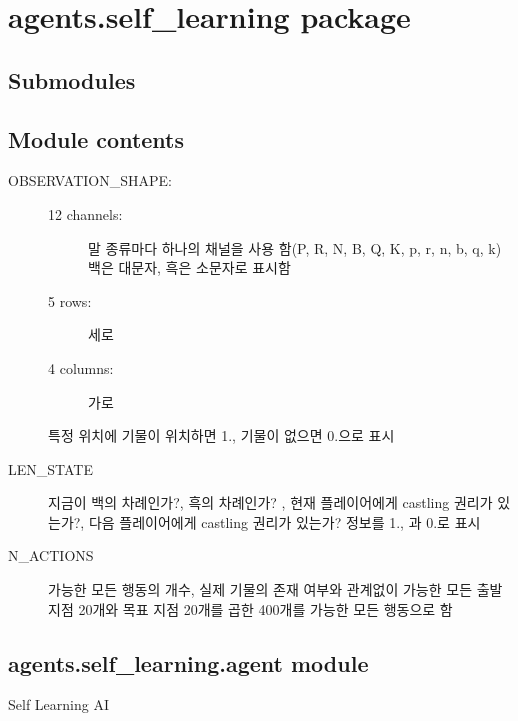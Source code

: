 \documentclass[letterpaper,10pt,english]{sphinxmanual}
\begin{document}
\section{agents.self\_learning package}
\label{\detokenize{agents.self_learning::doc}}\label{\detokenize{agents.self_learning:agents-self-learning-package}}

\subsection{Submodules}
\label{\detokenize{agents.self_learning:submodules}}

\subsection{Module contents}
\label{\detokenize{agents.self_learning:module-agents.self_learning}}\label{\detokenize{agents.self_learning:module-contents}}\begin{description}
\item[{OBSERVATION\_SHAPE:}] \leavevmode\begin{description}
\item[{12 channels: }] \leavevmode
말 종류마다 하나의 채널을 사용 함(P, R, N, B, Q, K, p, r, n, b, q, k)
백은 대문자, 흑은 소문자로 표시함

\item[{5 rows:}] \leavevmode
세로

\item[{4 columns:}] \leavevmode
가로

\end{description}

특정 위치에 기물이 위치하면 1., 기물이 없으면 0.으로 표시

\item[{LEN\_STATE}] \leavevmode
지금이 백의 차례인가?, 흑의 차례인가? , 
현재 플레이어에게 castling 권리가 있는가?, 다음 플레이어에게 castling 권리가 있는가?
정보를 1., 과 0.로 표시

\item[{N\_ACTIONS}] \leavevmode
가능한 모든 행동의 개수, 실제 기물의 존재 여부와 관계없이 
가능한 모든 출발 지점 20개와 목표 지점 20개를 곱한 400개를 가능한 모든 행동으로 함

\end{description}


\subsection{agents.self\_learning.agent module}
\label{\detokenize{agents.self_learning:agents-self-learning-agent-module}}\label{\detokenize{agents.self_learning:module-agents.self_learning.agent}}
Self Learning AI
\end{document}
